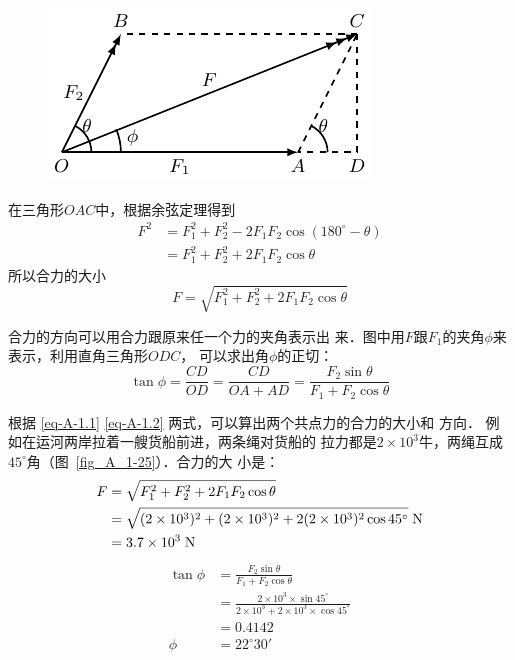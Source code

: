 \begin{figure}[htbp]
    \centering
    \includegraphics{fig/A/1-24.pdf} 
    \caption{} \label{fig_A_1-24} 
\end{figure} 


    在三角形$OAC$中，根据余弦定理得到
\[\begin{split} 
F^2 & = F_1^2+F_2^2-2F_1F_2\cos(180^\circ -\theta)  \\
&= F_1^2+F_2^2+2F_1F_2\cos\theta
\end{split}  \]
所以合力的大小
\begin{equation}\label{eq-A-1.1}
F=\sqrt{F_1^2+F_2^2+2F_1F_2\cos\theta} 
\end{equation} 

    合力的方向可以用合力跟原来任一个力的夹角表示出
来．图中用$F$跟$F_1$的夹角$\phi$来表示，利用直角三角形$ODC$，
可以求出角$\phi$的正切：
\begin{equation}\label{eq-A-1.2}
\tan\phi =\frac{CD} {OD} =\frac{CD} {OA+AD} =\frac{F_2\sin\theta } {F_1+F_2\cos\theta} 
\end{equation} 




    根据 \eqref{eq-A-1.1} \eqref{eq-A-1.2} 两式，可以算出两个共点力的合力的大小和
方向．
例如在运河两岸拉着一艘货船前进，两条绳对货船的
拉力都是$2\times 10^3$牛，两绳互成$45^\circ$角（图~\ref{fig_A_1-25}）．合力的大
小是：
\[\begin{split} 
F&= \sqrt{F_1^2+F_2^2+2F_1F_2\cos\theta} \\
&=\sqrt{(2\times 10^3)^2+(2\times 10^3)^2+2(2\times 10^3)^2\cos 45^{\circ} } \;\text{N} \\
&=3.7\times 10^3 \;\text{N} 
\end{split}  \]
\[\begin{split} 
\tan\phi&= \frac{F_2\sin\theta } {F_1+F_2\cos\theta} \\
&= \frac{2\times 10^3\times \sin 45^{\circ} } {2\times 10^3+2\times 10^3\times \cos 45^{\circ} }   \\
&=0.4142\\
\phi &= 22^{\circ}  30'
\end{split}  \]

